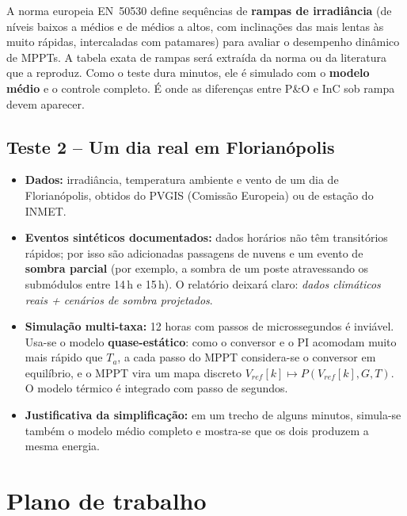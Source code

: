 \documentclass[11pt,a4paper]{article}
\begin{document}
A norma europeia EN~50530 define sequências de \textbf{rampas de irradiância} (de níveis
baixos a médios e de médios a altos, com inclinações das mais lentas às muito rápidas,
intercaladas com patamares) para avaliar o desempenho dinâmico de MPPTs. A tabela exata de
rampas será extraída da norma ou da literatura que a reproduz. Como o teste dura minutos, ele
é simulado com o \textbf{modelo médio} e o controle completo. É onde as diferenças entre P\&O
e InC sob rampa devem aparecer.

\subsection{Teste 2 -- Um dia real em Florianópolis}

\begin{itemize}
\item \textbf{Dados:} irradiância, temperatura ambiente e vento de um dia de Florianópolis,
obtidos do PVGIS (Comissão Europeia) ou de estação do INMET.
\item \textbf{Eventos sintéticos documentados:} dados horários não têm transitórios rápidos;
por isso são adicionadas passagens de nuvens e um evento de \textbf{sombra parcial} (por
exemplo, a sombra de um poste atravessando os submódulos entre 14\,h e 15\,h). O relatório
deixará claro: \emph{dados climáticos reais + cenários de sombra projetados}.
\item \textbf{Simulação multi-taxa:} 12 horas com passos de microssegundos é inviável. Usa-se o
modelo \textbf{quase-estático}: como o conversor e o PI acomodam muito mais rápido que $T_a$,
a cada passo do MPPT considera-se o conversor em equilíbrio, e o MPPT vira um mapa discreto
$V_{ref}[k]\mapsto P(V_{ref}[k],G,T)$. O modelo térmico é integrado com passo de segundos.
\item \textbf{Justificativa da simplificação:} em um trecho de alguns minutos, simula-se também
o modelo médio completo e mostra-se que os dois produzem a mesma energia.
\end{itemize}

\section{Plano de trabalho}
\end{document}
